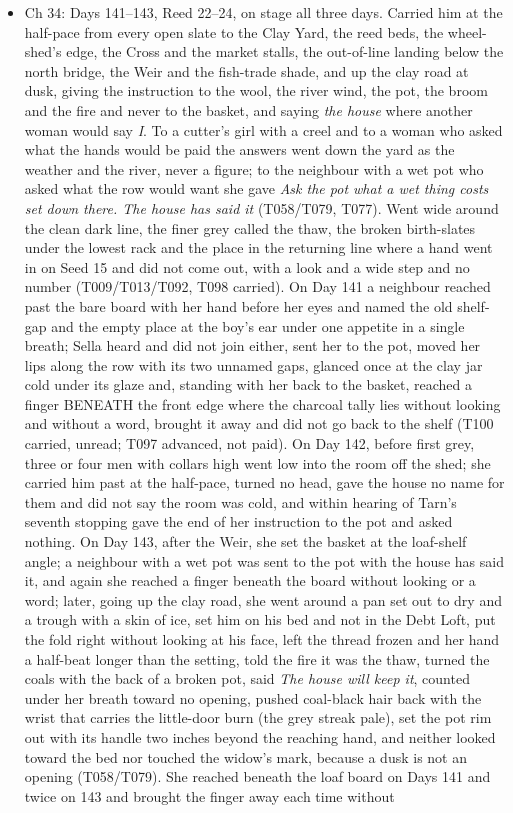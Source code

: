 \documentclass{design/chronicle}
\begin{document}
{\begin{itemize}[leftmargin=1.4em,itemsep=1pt,topsep=3pt,parsep=0pt]

\item Ch 34: Days 141–143, Reed 22–24, on stage all three days. Carried him at the half-pace from every open slate to the Clay Yard, the reed beds, the wheel-shed’s edge, the Cross and the market stalls, the out-of-line landing below the north bridge, the Weir and the fish-trade shade, and up the clay road at dusk, giving the instruction to the wool, the river wind, the pot, the broom and the fire and never to the basket, and saying \emph{the house} where another woman would say \emph{I}. To a cutter’s girl with a creel and to a woman who asked what the hands would be paid the answers went down the yard as the weather and the river, never a figure; to the neighbour with a wet pot who asked what the row would want she gave \emph{Ask the pot what a wet thing costs set down there. The house has said it} (T058/T079, T077). Went wide around the clean dark line, the finer grey called the thaw, the broken birth-slates under the lowest rack and the place in the returning line where a hand went in on Seed 15 and did not come out, with a look and a wide step and no number (T009/T013/T092, T098 carried). On Day 141 a neighbour reached past the bare board with her hand before her eyes and named the old shelf-gap and the empty place at the boy’s ear under one appetite in a single breath; Sella heard and did not join either, sent her to the pot, moved her lips along the row with its two unnamed gaps, glanced once at the clay jar cold under its glaze and, standing with her back to the basket, reached a finger BENEATH the front edge where the charcoal tally lies without looking and without a word, brought it away and did not go back to the shelf (T100 carried, unread; T097 advanced, not paid). On Day 142, before first grey, three or four men with collars high went low into the room off the shed; she carried him past at the half-pace, turned no head, gave the house no name for them and did not say the room was cold, and within hearing of Tarn’s seventh stopping gave the end of her instruction to the pot and asked nothing. On Day 143, after the Weir, she set the basket at the loaf-shelf angle; a neighbour with a wet pot was sent to the pot with the house has said it, and again she reached a finger beneath the board without looking or a word; later, going up the clay road, she went around a pan set out to dry and a trough with a skin of ice, set him on his bed and not in the Debt Loft, put the fold right without looking at his face, left the thread frozen and her hand a half-beat longer than the setting, told the fire it was the thaw, turned the coals with the back of a broken pot, said \emph{The house will keep it}, counted under her breath toward no opening, pushed coal-black hair back with the wrist that carries the little-door burn (the grey streak pale), set the pot rim out with its handle two inches beyond the reaching hand, and neither looked toward the bed nor touched the widow’s mark, because a dusk is not an opening (T058/T079). She reached beneath the loaf board on Days 141 and twice on 143 and brought the finger away each time without 
\end{itemize}}
\end{document}
